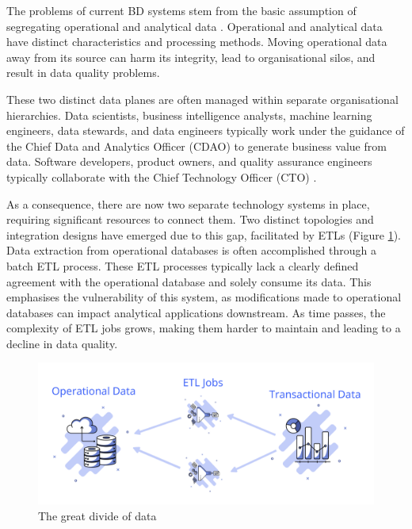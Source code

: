 \documentclass{ieeeaccess}
\begin{document}
The problems of current BD systems stem from the basic assumption of segregating operational and analytical data \cite{ataei2022state}. Operational and analytical data have distinct characteristics and processing methods. Moving operational data away from its source can harm its integrity, lead to organisational silos, and result in data quality problems. 

These two distinct data planes are often managed within separate organisational hierarchies. Data scientists, business intelligence analysts, machine learning engineers, data stewards, and data engineers typically work under the guidance of the Chief Data and Analytics Officer (CDAO) to generate business value from data. Software developers, product owners, and quality assurance engineers typically collaborate with the Chief Technology Officer (CTO) \cite{DataMesh}.

As a consequence, there are now two separate technology systems in place, requiring significant resources to connect them. Two distinct topologies and integration designs have emerged due to this gap, facilitated by ETLs (Figure \ref{fig:dataPlanes}). Data extraction from operational databases is often accomplished through a batch ETL process. These ETL processes typically lack a clearly defined agreement with the operational database and solely consume its data. This emphasises the vulnerability of this system, as modifications made to operational databases can impact analytical applications downstream. As time passes, the complexity of ETL jobs grows, making them harder to maintain and leading to a decline in data quality. 

\begin{figure}[h]

  \centering

  \includegraphics[width=\linewidth]{images/data-planes.png}

  \caption{The great divide of data}

  \label{fig:dataPlanes}

\end{figure}
\end{document}
